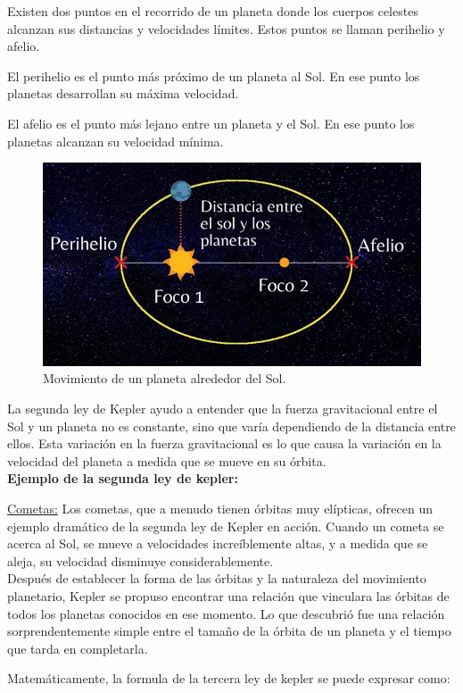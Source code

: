 \documentclass{article}
\begin{document}
	Existen dos puntos en el recorrido de un planeta donde los cuerpos celestes alcanzan sus distancias y velocidades límites. Estos puntos se llaman perihelio y afelio.
	
	El perihelio es el punto más próximo de un planeta al Sol. En ese punto los planetas desarrollan su máxima velocidad.
	
	El afelio es el punto más lejano entre un planeta y el Sol. En ese punto los planetas alcanzan su velocidad mínima.
	
	\begin{figure}[H]
		\centering
		\includegraphics[width=0.6\linewidth]{segunda_ley}
		\caption{Movimiento de un planeta alrededor del Sol.}
		\label{fig:segundaley}
	\end{figure}
	
	
	La segunda ley de Kepler ayudo a entender que la fuerza gravitacional entre el Sol y un planeta no es constante, sino que varía dependiendo de la distancia entre ellos. Esta variación en la fuerza gravitacional es lo que causa la variación en la velocidad del planeta a medida que se mueve en su órbita.\\
	
	\textbf{Ejemplo de la segunda ley de kepler:}
	
	\underline{Cometas:} Los cometas, que a menudo tienen órbitas muy elípticas, ofrecen un ejemplo dramático de la segunda ley de Kepler en acción. Cuando un cometa se acerca al Sol, se mueve a velocidades increíblemente altas, y a medida que se aleja, su velocidad disminuye considerablemente.\\
	
	Después de establecer la forma de las órbitas y la naturaleza del movimiento planetario, Kepler se propuso encontrar una relación que vinculara las órbitas de todos los planetas conocidos en ese momento. Lo que descubrió fue una relación sorprendentemente simple entre el tamaño de la órbita de un planeta y el tiempo que tarda en completarla.
	
	Matemáticamente, la formula de la tercera ley de kepler se puede expresar como:
	
\end{document}

